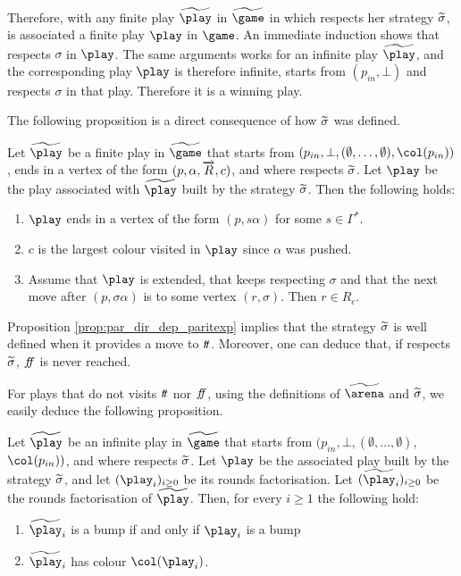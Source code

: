 Therefore, with any finite play $\fplay$ in $\fgame$ in which \Eve
respects her strategy $\widetilde{\sigma}$, is associated a finite play $\play$ in
$\game$. An immediate induction shows that \Eve respects $\sigma$ in
$\play$. The same arguments works for an infinite play $\fplay$, and the
corresponding play $\play$ is therefore infinite, starts from
$(p_{in},\bot)$ and \Eve respects $\sigma$ in that play. Therefore it is
a winning play.

The following proposition is a direct consequence of how $\widetilde{\sigma}$ was defined.

\begin{proposition}\label{prop:par_dir_dep_paritexp}
Let $\fplay$ be a finite play in $\fgame$ that starts from
$(p_{in},\bot,(\emptyset,\dots,\emptyset),\pdscol{p_{in}})$,
ends in a vertex of the form $(p,\alpha,\overrightarrow{R},c)$,
and where \Eve respects $\widetilde{\sigma}$. Let $\play$ be the play associated with $\fplay$
built by the strategy $\widetilde{\sigma}$. Then the following holds:
\begin{enumerate}
\item $\play$ ends in a vertex of the form $(p,s\alpha)$ for some $s\in\Gamma^*$.

\item $c$ is the largest colour visited in $\play$ since $\alpha$ was pushed.

\item Assume that $\play$ is extended, that \Eve keeps respecting
  $\sigma$ and that the next move after $(p,\sigma\alpha)$ is to some
  vertex $(r,\sigma)$. Then $r\in R_c$.
\end{enumerate}
\end{proposition}


Proposition \cref{prop:par_dir_dep_paritexp} implies that the
strategy $\widetilde{\sigma}$ is well defined when it provides a move to
$t\! t$. Moreover, one can deduce that, if \Eve respects $\widetilde{\sigma}$, $f\!\! f$ is never reached.

For plays that do not visits $t\! t$ nor $f\!\! f$, using the definitions of $\farena$ and $\widetilde{\sigma}$, we easily deduce the
following proposition.


\begin{proposition}\label{prop:toto}
Let $\fplay$ be an infinite play in $\fgame$ that starts from
$(p_{in},\bot,(\emptyset,\dots,\emptyset),$ $\pdscol{p_{in}})$,
and where \Eve respects $\widetilde{\sigma}$. Let $\play$ be the associated
play built by the strategy $\widetilde{\sigma}$, and let $(\play_i)_{i\geq 0}$ be its rounds factorisation. Let $(\fplay_i)_{i\geq 0}$ be
the rounds factorisation of $\fplay$. Then, for every $i\geq 1$ the
following hold:
\begin{enumerate}
\item $\fplay_i$ is a bump if and only if $\play_i$ is a bump

\item $\fplay_i$ has colour $\pdscol{\play_i}$.
\end{enumerate}
\end{proposition}

